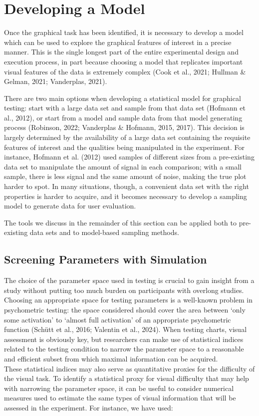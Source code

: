 \documentclass[
  10pt,
  letterpaper,
  DIV=11,
  numbers=noendperiod]{scrartcl}
\begin{document}
\section{Developing a Model}\label{sec-model-dev}

Once the graphical task has been identified, it is necessary to develop
a model which can be used to explore the graphical features of interest
in a precise manner. This is the single longest part of the entire
experimental design and execution process, in part because choosing a
model that replicates important visual features of the data is extremely
complex (Cook et al., 2021; Hullman \& Gelman, 2021; Vanderplas, 2021).

There are two main options when developing a statistical model for
graphical testing: start with a large data set and sample from that data
set (Hofmann et al., 2012), or start from a model and sample data from
that model generating process (Robinson, 2022; Vanderplas \& Hofmann,
2015, 2017). This decision is largely determined by the availability of
a large data set containing the requisite features of interest and the
qualities being manipulated in the experiment. For instance, Hofmann et
al. (2012) used samples of different sizes from a pre-existing data set
to manipulate the amount of signal in each comparison; with a small
sample, there is less signal and the same amount of noise, making the
true plot harder to spot. In many situations, though, a convenient data
set with the right properties is harder to acquire, and it becomes
necessary to develop a sampling model to generate data for user
evaluation.

The tools we discuss in the remainder of this section can be applied
both to pre-existing data sets and to model-based sampling methods.

\subsection{Screening Parameters with
Simulation}\label{screening-parameters-with-simulation}

The choice of the parameter space used in testing is crucial to gain
insight from a study without putting too much burden on participants
with overlong studies. Choosing an appropriate space for testing
parameters is a well-known problem in psychometric testing: the space
considered should cover the area between `only some activation' to
`almost full activation' of an appropriate psychometric function (Schütt
et al., 2016; Valentin et al., 2024). When testing charts, visual
assessment is obviously key, but researchers can make use of statistical
indices related to the testing condition to narrow the parameter space
to a reasonable and efficient subset from which maximal information can
be acquired.\\
These statistical indices may also serve as quantitative proxies for the
difficulty of the visual task. To identify a statistical proxy for
visual difficulty that may help with narrowing the parameter space, it
can be useful to consider numerical measures used to estimate the same
types of visual information that will be assessed in the experiment. For
instance, we have used:
\end{document}
